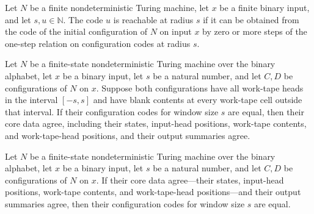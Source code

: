 \begin{definition}
\label{Complexity.ExpBFS.RCode}
\leanok
{}
Let $N$ be a finite nondeterministic Turing machine, let $x$ be a finite binary input,
and let $s,u\in\mathbb{N}$. The code $u$ is reachable at radius $s$ if it can be
obtained from the code of the initial configuration of $N$ on input $x$ by zero or more
steps of the one-step relation on configuration codes at radius $s$.
\end{definition}

\begin{lemma}
\label{Complexity.ExpBFS.coreSum_eq_of_code_eq}
\leanok
{}
Let $N$ be a finite-state nondeterministic Turing machine over the binary alphabet, let
$x$ be a binary input, let $s$ be a natural number, and let $C,D$ be configurations of
$N$ on $x$. Suppose both configurations have all work-tape heads in the interval
$[-s,s]$ and have blank contents at every work-tape cell outside that interval. If their
configuration codes for window size $s$ are equal, then their core data agree, including
their states, input-head positions, work-tape contents, and work-tape-head positions,
and their output summaries agree.
\end{lemma}

\begin{lemma}
\label{Complexity.ExpBFS.code_eq_of_coreSum_eq}
\leanok
{}
Let $N$ be a finite-state nondeterministic Turing machine over the binary alphabet, let
$x$ be a binary input, let $s$ be a natural number, and let $C,D$ be configurations of
$N$ on $x$. If their core data agree—their states, input-head positions, work-tape
contents, and work-tape-head positions—and their output summaries agree, then their
configuration codes for window size $s$ are equal.
\end{lemma}

